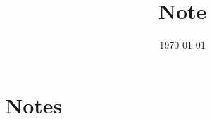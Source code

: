 \documentclass[UTF8,11pt]{ctexart}
\title{Note}
\author{}
\date{\today}
\begin{document}
\section{Notes}
\end{document}
